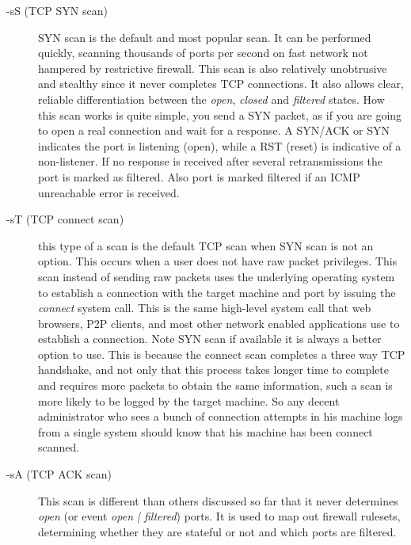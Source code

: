 \documentclass[times, utf8, seminar,english]{fer}
\begin{document}
\pagebreak
\begin{description}
	\item [-sS (TCP SYN scan)] SYN scan is the default and most popular scan. It can be performed quickly, scanning thousands of ports per second on fast network not hampered by restrictive firewall. This scan is also relatively unobtrusive and stealthy since it never completes TCP connections. It also allows clear, reliable differentiation between the \textit{open}, \textit{closed} and \textit{filtered} states. How this scan works is quite simple, you send a SYN packet, as if you are going to open a real connection and wait for a response. A SYN/ACK or SYN indicates the port is listening (open), while a RST (reset) is indicative of a non-listener. If no response is received after several retransmissions the port is marked as filtered. Also port is marked filtered if an ICMP unreachable error is received.
	\item [-sT (TCP connect scan)] this type of a scan is the default TCP scan when SYN scan is not an option. This occurs when a user does not have raw packet privileges. This scan instead of sending raw packets uses the underlying operating system to establish a connection with the target machine and port by issuing the \textit{connect} system call. This is the same high-level system call that web browsers, P2P clients, and most other network enabled applications use to establish a connection. Note SYN scan if available it is always a better option to use. This is because the connect scan completes a three way TCP handshake, and not only that this process takes longer time to complete and requires more packets to obtain the same information, such a scan is more likely to be logged by the target machine. So any decent administrator who sees a bunch of connection attempts in his machine logs from a single system should know that his machine has been connect scanned.
	\item [-sA (TCP ACK scan)] This scan is different than others discussed so far that it never determines \textit{open} (or event \textit{open | filtered}) ports. It is used to map out firewall rulesets, determining whether they are stateful or not and which ports are filtered.

\end{description}
\end{document}
